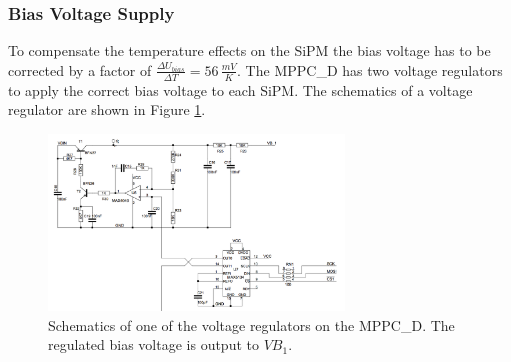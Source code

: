 \newpage

\subsubsection{Bias Voltage Supply}

To compensate the temperature effects on the SiPM the bias voltage has to be corrected by a factor of $\frac{\Delta U_{bias}}{\Delta T} = 56\,\frac{mV}{K}$. The MPPC\_D has two 
voltage regulators to apply the correct bias voltage to each SiPM. The schematics of a voltage regulator are shown in Figure \ref{voltage_regulator}. 
	
	\begin{figure}[t]
		\centering
			\includegraphics[width=0.7\textwidth]{Figures/weinstock/dac_circuit.png}
		\caption{Schematics of one of the voltage regulators on the MPPC\_D. The regulated bias voltage is output to $VB_1$.}
		\label{voltage_regulator}
	\end{figure}	

